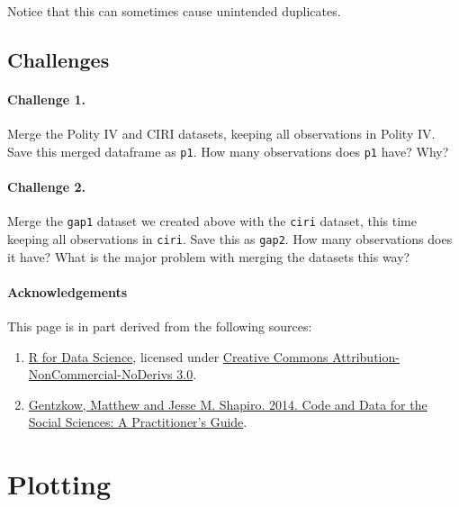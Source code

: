 \documentclass[]{book}
\begin{document}
Notice that this can sometimes cause unintended duplicates.

\section{Challenges}\label{challenges-8}

\subsubsection*{Challenge 1.}\label{challenge-1.-5}

Merge the Polity IV and CIRI datasets, keeping all observations in
Polity IV. Save this merged dataframe as \texttt{p1}. How many
observations does \texttt{p1} have? Why?

\subsubsection*{Challenge 2.}\label{challenge-2.-4}

Merge the \texttt{gap1} dataset we created above with the \texttt{ciri}
dataset, this time keeping all observations in \texttt{ciri}. Save this
as \texttt{gap2}. How many observations does it have? What is the major
problem with merging the datasets this way?

\subsubsection*{Acknowledgements}\label{acknowledgements-1}

This page is in part derived from the following sources:

\begin{enumerate}
\def\labelenumi{\arabic{enumi}.}
\item
  \href{https://r4ds.had.co.nz}{R for Data Science}, licensed under
  \href{https://creativecommons.org/licenses/by-nc-nd/3.0/us/}{Creative
  Commons Attribution-NonCommercial-NoDerivs 3.0}.
\item
  \href{https://web.stanford.edu/~gentzkow/research/CodeAndData.pdf}{Gentzkow,
  Matthew and Jesse M. Shapiro. 2014. Code and Data for the Social
  Sciences: A Practitioner's Guide}.
\end{enumerate}

\chapter{Plotting}\label{plotting}
\end{document}
